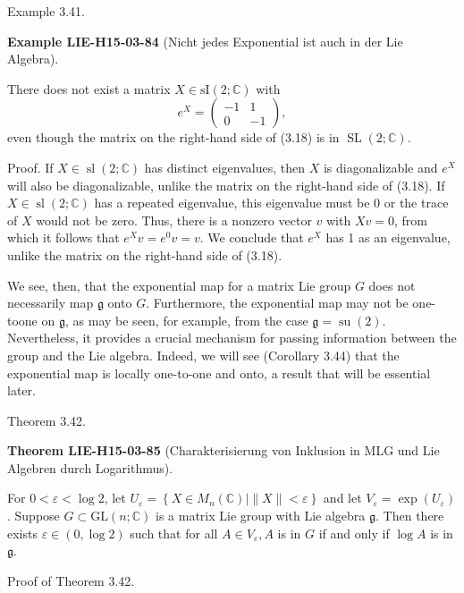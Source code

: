 \documentclass[10pt, letterpaper]{article}
\newcommand{\CustomHeading}[3]{%
  \par\medskip\noindent%
  \textbf{#1 #2} \textnormal{(#3)}.\enskip%
}
\newenvironment{THEO}[2]{\begin{unitbox}\CustomHeading{Theorem}{#1}{#2}}{\end{unitbox}}
\newenvironment{EXA}[2]{\begin{unitbox}\CustomHeading{Example}{#1}{#2}}{\end{unitbox}}
\begin{document}
Example 3.41. 

\begin{EXA}{LIE-H15-03-84}{Nicht jedes Exponential ist auch in der Lie Algebra}
There does not exist a matrix $X \in \mathrm{sI}(2 ; \mathbb{C})$ with
$$
e^{X}=\left(\begin{array}{rr}
-1 & 1 \\
0 & -1
\end{array}\right),
$$
even though the matrix on the right-hand side of (3.18) is in $\operatorname{SL}(2 ; \mathbb{C})$.


Proof. If $X \in \operatorname{sl}(2 ; \mathbb{C})$ has distinct eigenvalues, then $X$ is diagonalizable and $e^{X}$ will also be diagonalizable, unlike the matrix on the right-hand side of (3.18). If $X \in \operatorname{sl}(2 ; \mathbb{C})$ has a repeated eigenvalue, this eigenvalue must be 0 or the trace of $X$ would not be zero. Thus, there is a nonzero vector $v$ with $X v=0$, from which it follows that $e^{X} v=e^{0} v=v$. We conclude that $e^{X}$ has 1 as an eigenvalue, unlike the matrix on the right-hand side of (3.18).
\end{EXA}

We see, then, that the exponential map for a matrix Lie group $G$ does not necessarily map $\mathfrak{g}$ onto $G$. Furthermore, the exponential map may not be one-toone on $\mathfrak{g}$, as may be seen, for example, from the case $\mathfrak{g}=\operatorname{su}(2)$. Nevertheless, it provides a crucial mechanism for passing information between the group and the Lie algebra. Indeed, we will see (Corollary 3.44) that the exponential map is locally one-to-one and onto, a result that will be essential later.

Theorem 3.42. 


\begin{THEO}{LIE-H15-03-85}{Charakterisierung von Inklusion in MLG und Lie Algebren durch Logarithmus}
For $0<\varepsilon<\log 2$, let $U_{\varepsilon}=\left\{X \in M_{n}(\mathbb{C}) \mid\|X\|<\varepsilon\right\}$ and let $V_{\varepsilon}=\exp \left(U_{\varepsilon}\right)$. Suppose $G \subset \mathrm{GL}(n ; \mathbb{C})$ is a matrix Lie group with Lie algebra $\mathfrak{g}$. Then there exists $\varepsilon \in(0, \log 2)$ such that for all $A \in V_{\varepsilon}, A$ is in $G$ if and only if $\log A$ is in $\mathfrak{g}$.
\end{THEO}


Proof of Theorem 3.42. 
\end{document}
